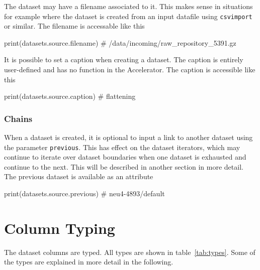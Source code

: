 The dataset may have a filename associated to it.  This makes sense in
situations for example where the dataset is created from an input
datafile using \texttt{csvimport} or similar.  The filename is
accessable like this

\begin{python}
print(datasets.source.filename)
# /data/incoming/raw_repository_5391.gz
\end{python}
It is possible to set a caption when creating a dataset.  The caption
is entirely user-defined and has no function in the Accelerator.  The
caption is accessible like this

\begin{python}
print(datasets.source.caption)
# flattening
\end{python}



\subsubsection{Chains}

When a dataset is created, it is optional to input a link to another
dataset using the parameter \texttt{previous}.  This has effect on the
dataset iterators, which may continue to iterate over dataset
boundaries when one dataset is exhausted and continue to the next.
This will be described in another section in more detail.  The
previous dataset is available as an attribute

\begin{python}
print(datasets.source.previous)
# neu4-4893/default
\end{python}



\newpage
\section{Column Typing}
The dataset columns are typed.  All types are shown in table~\ref{tab:types}.
Some of the types are explained in more detail in the following.

